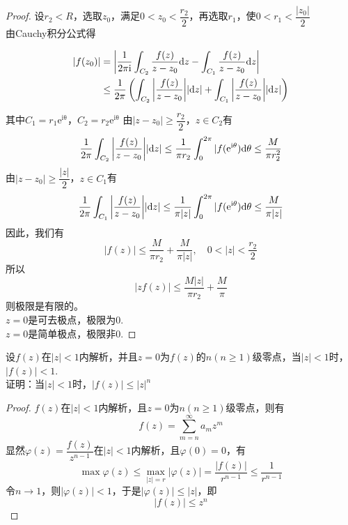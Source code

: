 \begin{proof}
    
    设$r_2 < R$，选取$z_0$，满足$0 < z_0 < \dfrac{r_2}{2}$，再选取$r_1$，使$0 < r_1 < \dfrac{|z_0|}{2}$ \\
    由\textup{Cauchy}积分公式得

    \begin{align*}
        |f(z_0)| & = \left| \dfrac{1}{2\mathrm{\pi i}} \int_{C_2}{\dfrac{f(z)}{z - z_0}}\mathrm{d} z - \int_{C_1}{\dfrac{f(z)}{z - z_0}}\mathrm{d} z \right| \\
        & \leq \dfrac{1}{2 \pi} \left( \int_{C_2}{\left| \dfrac{f(z)}{z - z_0} \right|}|\mathrm{d} z| + \int_{C_1}{\left| \dfrac{f(z)}{z - z_0} \right|}|\mathrm{d} z| \right)
    \end{align*}

    其中$C_1 = r_1\mathrm{e^{i\theta}}$，$C_2 = r_2\mathrm{e^{i\theta}}$
    由$|z - z_0| \geq \dfrac{r_2}{2}$，$z \in C_2$有
    \[ \dfrac{1}{2 \pi} \int_{C_2}{\left| \dfrac{f(z)}{z - z_0} \right|}|\mathrm{d} z| \leq \dfrac{1}{ \pi r_2}\int_{0}^{2 \pi}{|f(\mathrm{e}^{\mathrm{i}\theta})}\mathrm{d} \theta \leq \dfrac{M}{ \pi r_2^2}\]
    由$|z - z_0| \geq \dfrac{|z|}{2}$，$z \in C_1$有
    \[ \dfrac{1}{2 \pi} \int_{C_1}{\left| \dfrac{f(z)}{z - z_0} \right|}|\mathrm{d} z| \leq \dfrac{1}{ \pi|z|}\int_{0}^{2 \pi}{|f(\mathrm{e}^{\mathrm{i}\theta})}\mathrm{d} \theta \leq \dfrac{M}{ \pi|z|}\]
    因此，我们有
    \[|f(z)| \leq \dfrac{M}{ \pi r_2} + \dfrac{M}{ \pi|z|}, \quad 0 < |z| < \dfrac{r_2}{2}\]
    所以\[|zf(z)| \leq \dfrac{M|z|}{ \pi r_2} + \dfrac{M}{\pi}\]
    则极限是有限的。\\
    $z = 0$是可去极点，极限为$0$. \\
    $z = 0$是简单极点，极限非$0$.

\end{proof}

\begin{proposition}

    设$f(z)$在$|z| < 1 $内解析，并且$z = 0$为$f(z)$的$n(n \geq 1)$级零点，当$|z| < 1$时，$|f(z)| < 1$. \\
    证明：当$|z| < 1$时，$|f(z)| \leq |z|^n$

\end{proposition}

\begin{proof}
    
    $f(z)$在$|z| < 1$内解析，且$z = 0$为$n(n \geq 1)$级零点，则有
    \[f(z) = \sum\limits_{m = n}^{\infty}{a_mz^m}\]
    显然$\varphi(z) = \dfrac{f(z)}{z^{n - 1}}$在$|z| < 1$内解析，且$\varphi(0) = 0$，有
    \[ \max\varphi(z) \leq \max_{|z| = r}|\varphi(z)| = \dfrac{|f(z)|}{r^{n - 1}} \leq \dfrac{1}{r^{n - 1}} \]
    令$n \to 1$，则$|\varphi(z)| < 1$，于是$|\varphi(z)| \leq |z|$，即
    \[|f(z)| \leq z^n\]

\end{proof}


